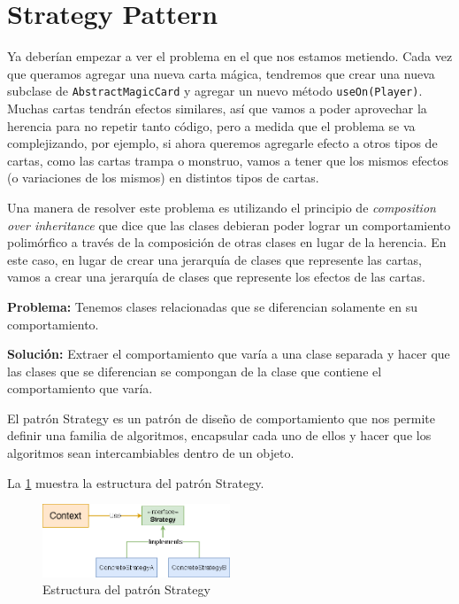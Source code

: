 \section{Strategy Pattern}
\label{sec:oop:strategy:pattern}

  Ya deberían empezar a ver el problema en el que nos estamos metiendo.
  Cada vez que queramos agregar una nueva carta mágica, tendremos que crear una nueva subclase de
  \texttt{AbstractMagicCard} y agregar un nuevo método \texttt{useOn(Player)}.
  Muchas cartas tendrán efectos similares, así que vamos a poder aprovechar la herencia para no
  repetir tanto código, pero a medida que el problema se va complejizando, por ejemplo, si ahora 
  queremos agregarle efecto a otros tipos de cartas, como las cartas trampa o monstruo, vamos a 
  tener que los mismos efectos (o variaciones de los mismos) en distintos tipos de cartas.

  Una manera de resolver este problema es utilizando el principio de \textit{composition over
  inheritance} que dice que las clases debieran poder lograr un comportamiento polimórfico a través
  de la composición de otras clases en lugar de la herencia.
  En este caso, en lugar de crear una jerarquía de clases que represente las cartas, vamos a crear
  una jerarquía de clases que represente los efectos de las cartas.

  \begin{defaultbox}
    \textbf{Problema:} Tenemos clases relacionadas que se diferencian solamente en su 
    comportamiento.

    \textbf{Solución:} Extraer el comportamiento que varía a una clase separada y hacer que las
    clases que se diferencian se compongan de la clase que contiene el comportamiento que varía.
  \end{defaultbox}

  El patrón Strategy es un patrón de diseño de comportamiento que nos permite definir una familia
  de algoritmos, encapsular cada uno de ellos y hacer que los algoritmos sean intercambiables dentro
  de un objeto.

  La \cref{fig:oop:strategy:pattern} muestra la estructura del patrón Strategy.

  \begin{figure}[ht]
    \centering
    \includegraphics[width=0.5\textwidth]{img/oop/strategy/strategy_pattern.png}
    \caption{Estructura del patrón Strategy}
    \label{fig:oop:strategy:pattern}
  \end{figure}

